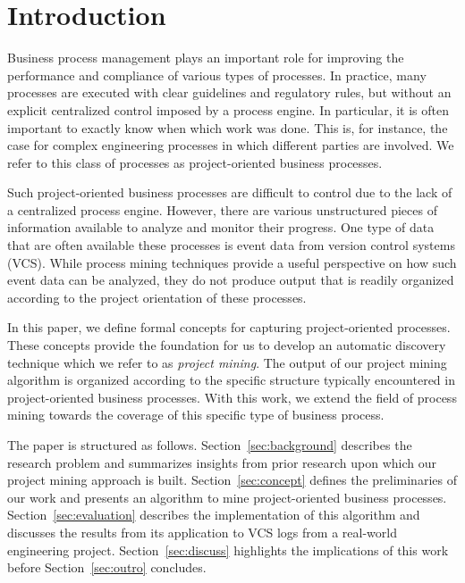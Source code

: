 \section{Introduction}
Business process management plays an important role for improving the performance and compliance of various types of processes. In practice, many processes are executed with clear guidelines and regulatory rules, but without an explicit centralized control imposed by a process engine. In particular, it is often important to exactly know when which work was done. This is, for instance, the case for complex engineering processes in which different parties are involved. We refer to this class of processes as project-oriented business processes.

Such project-oriented business processes are difficult to control due to the lack of a centralized process engine. However, there are various unstructured pieces of information available to analyze and monitor their progress. One type of data that are often available these processes is event data from version control systems (VCS). While process mining techniques provide a useful perspective on how such event data can be analyzed, they do not produce output that is readily organized according to the project orientation of these processes.

In this paper, we define formal concepts for capturing project-oriented processes. These concepts provide the foundation for us to develop an automatic discovery technique which we refer to as \emph{project mining}. The output of our project mining algorithm is organized according to the specific structure typically encountered in project-oriented business processes. With this work, we extend the field of process mining towards the coverage of this specific type of business process.

The paper is structured as follows. Section~\ref{sec:background} describes the research problem and summarizes insights from prior research upon which our project mining approach is built. Section~\ref{sec:concept} defines the preliminaries of our work and presents an algorithm to mine project-oriented business processes. Section~\ref{sec:evaluation} describes the implementation of this algorithm and discusses the results from its application to VCS logs from a real-world engineering project. Section~\ref{sec:discuss} highlights the implications of this work before Section~\ref{sec:outro} concludes. 